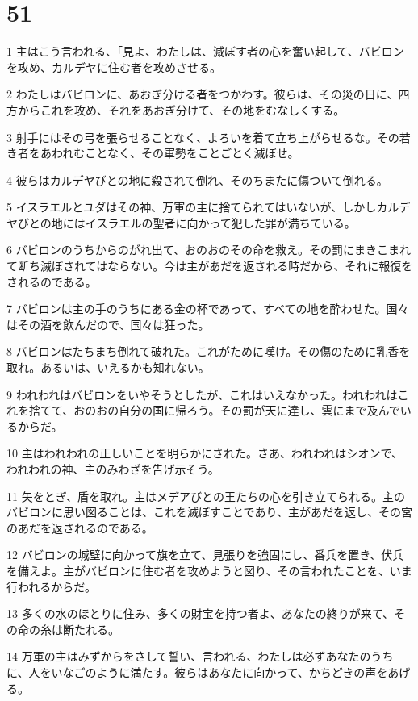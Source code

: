\chapter{51}

\par 1 主はこう言われる、「見よ、わたしは、滅ぼす者の心を奮い起して、バビロンを攻め、カルデヤに住む者を攻めさせる。
\par 2 わたしはバビロンに、あおぎ分ける者をつかわす。彼らは、その災の日に、四方からこれを攻め、それをあおぎ分けて、その地をむなしくする。
\par 3 射手にはその弓を張らせることなく、よろいを着て立ち上がらせるな。その若き者をあわれむことなく、その軍勢をことごとく滅ぼせ。
\par 4 彼らはカルデヤびとの地に殺されて倒れ、そのちまたに傷ついて倒れる。
\par 5 イスラエルとユダはその神、万軍の主に捨てられてはいないが、しかしカルデヤびとの地にはイスラエルの聖者に向かって犯した罪が満ちている。
\par 6 バビロンのうちからのがれ出て、おのおのその命を救え。その罰にまきこまれて断ち滅ぼされてはならない。今は主があだを返される時だから、それに報復をされるのである。
\par 7 バビロンは主の手のうちにある金の杯であって、すべての地を酔わせた。国々はその酒を飲んだので、国々は狂った。
\par 8 バビロンはたちまち倒れて破れた。これがために嘆け。その傷のために乳香を取れ。あるいは、いえるかも知れない。
\par 9 われわれはバビロンをいやそうとしたが、これはいえなかった。われわれはこれを捨てて、おのおの自分の国に帰ろう。その罰が天に達し、雲にまで及んでいるからだ。
\par 10 主はわれわれの正しいことを明らかにされた。さあ、われわれはシオンで、われわれの神、主のみわざを告げ示そう。
\par 11 矢をとぎ、盾を取れ。主はメデアびとの王たちの心を引き立てられる。主のバビロンに思い図ることは、これを滅ぼすことであり、主があだを返し、その宮のあだを返されるのである。
\par 12 バビロンの城壁に向かって旗を立て、見張りを強固にし、番兵を置き、伏兵を備えよ。主がバビロンに住む者を攻めようと図り、その言われたことを、いま行われるからだ。
\par 13 多くの水のほとりに住み、多くの財宝を持つ者よ、あなたの終りが来て、その命の糸は断たれる。
\par 14 万軍の主はみずからをさして誓い、言われる、わたしは必ずあなたのうちに、人をいなごのように満たす。彼らはあなたに向かって、かちどきの声をあげる。

